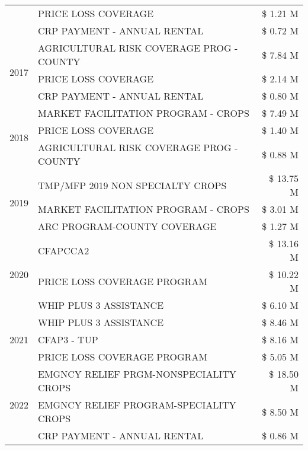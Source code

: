 \begin{tabular}{llr}
 & PRICE LOSS COVERAGE & \$ 1.21 M \\
 & CRP PAYMENT - ANNUAL RENTAL & \$ 0.72 M \\
\cline{1-3}
\multirow[t]{3}{*}{2017} & AGRICULTURAL RISK COVERAGE PROG - COUNTY & \$ 7.84 M \\
 & PRICE LOSS COVERAGE & \$ 2.14 M \\
 & CRP PAYMENT - ANNUAL RENTAL & \$ 0.80 M \\
\cline{1-3}
\multirow[t]{3}{*}{2018} & MARKET FACILITATION PROGRAM - CROPS & \$ 7.49 M \\
 & PRICE LOSS COVERAGE & \$ 1.40 M \\
 & AGRICULTURAL RISK COVERAGE PROG - COUNTY & \$ 0.88 M \\
\cline{1-3}
\multirow[t]{3}{*}{2019} & TMP/MFP 2019 NON SPECIALTY CROPS & \$ 13.75 M \\
 & MARKET FACILITATION PROGRAM - CROPS & \$ 3.01 M \\
 & ARC PROGRAM-COUNTY COVERAGE & \$ 1.27 M \\
\cline{1-3}
\multirow[t]{3}{*}{2020} & CFAPCCA2 & \$ 13.16 M \\
 & PRICE LOSS COVERAGE PROGRAM & \$ 10.22 M \\
 & WHIP PLUS 3 ASSISTANCE & \$ 6.10 M \\
\cline{1-3}
\multirow[t]{3}{*}{2021} & WHIP PLUS 3 ASSISTANCE & \$ 8.46 M \\
 & CFAP3 - TUP & \$ 8.16 M \\
 & PRICE LOSS COVERAGE PROGRAM & \$ 5.05 M \\
\cline{1-3}
\multirow[t]{3}{*}{2022} & EMGNCY RELIEF PRGM-NONSPECIALITY CROPS & \$ 18.50 M \\
 & EMGNCY RELIEF PROGRAM-SPECIALITY CROPS & \$ 8.50 M \\
 & CRP PAYMENT - ANNUAL RENTAL & \$ 0.86 M \\
\cline{1-3}
\bottomrule
\end{tabular}
